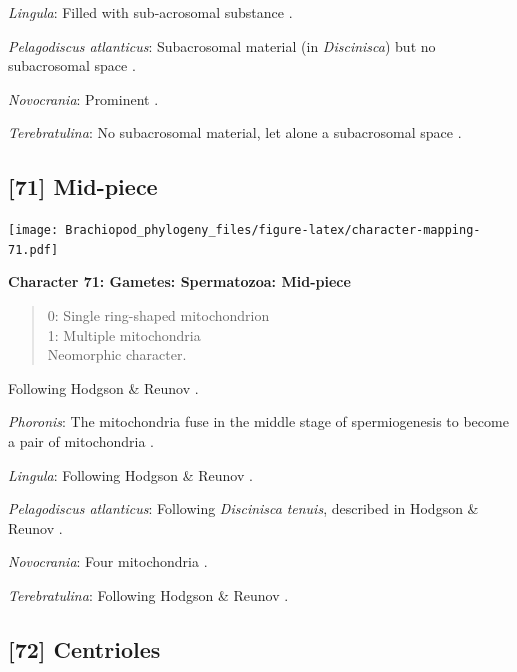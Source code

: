 \documentclass[]{book}
\theoremstyle{definition}
\theoremstyle{definition}
\theoremstyle{definition}
\theoremstyle{remark}
\begin{document}
\emph{Lingula}: Filled with sub-acrosomal substance
\citep{Fukumoto2003Theacrosome}.

\emph{Pelagodiscus atlanticus}: Subacrosomal material (in
\emph{Discinisca}) but no subacrosomal space
\citep{Hodgson1994Ultrastructureof}.

\emph{Novocrania}: Prominent \citep{Afzelius1978Finestructure}.

\emph{Terebratulina}: No subacrosomal material, let alone a subacrosomal
space \citep[e.g.][]{Hodgson1994Ultrastructureof}.

\hypertarget{mid-piece}{%
\subsection*{{[}71{]} Mid-piece}\label{mid-piece}}

\texttt{[image: Brachiopod\_phylogeny\_files/figure-latex/character-mapping-71.pdf]}

\textbf{Character 71: Gametes: Spermatozoa: Mid-piece}

\begin{quote}
0: Single ring-shaped mitochondrion\\
1: Multiple mitochondria\\
Neomorphic character.
\end{quote}

Following Hodgson \& Reunov \citeyearpar{Hodgson1994Ultrastructureof}.

\emph{Phoronis}: The mitochondria fuse in the middle stage of
spermiogenesis to become a pair of mitochondria
\citep{Reunov2004Ultrastructuralstudy}.

\emph{Lingula}: Following Hodgson \& Reunov
\citeyearpar{Hodgson1994Ultrastructureof}.

\emph{Pelagodiscus atlanticus}: Following \emph{Discinisca}
\emph{tenuis}, described in Hodgson \& Reunov
\citeyearpar{Hodgson1994Ultrastructureof}.

\emph{Novocrania}: Four mitochondria \citep{Afzelius1978Finestructure}.

\emph{Terebratulina}: Following Hodgson \& Reunov
\citeyearpar{Hodgson1994Ultrastructureof}.

\hypertarget{centrioles}{%
\subsection*{{[}72{]} Centrioles}\label{centrioles}}
\end{document}
